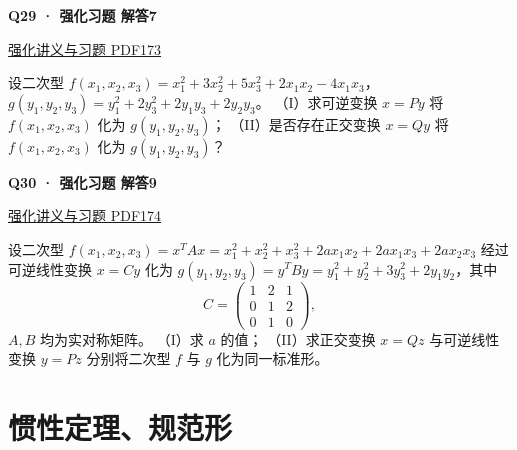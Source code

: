 \documentclass[UTF8,fontset=fandol,11pt,a4paper]{ctexart}
\newcommand{\source}[1]{{\footnotesize\color{Muted}#1\par}}
\newcommand{\qtitle}[2]{\par\needspace{5\baselineskip}\hypertarget{#1}{}\label{#1}\textbf{#2}\par}
\begin{document}
\begin{minipage}{\linewidth}
\qtitle{R-LONG-07}{Q29 · 强化习题 解答7}
\source{\href{file:///Users/skyintelligence/Desktop/\%E5\%BE\%97\%E8\%AF\%BB\%E4\%B8\%AA\%E7\%A0\%94-\%E5\%8C\%97\%E5\%A4\%A7\%E8\%BD\%AF\%E5\%BE\%AE/\%E6\%95\%B0\%E5\%AD\%A6\%20150/Kira\%C2\%B727\%E7\%BA\%BF\%E6\%80\%A7\%E4\%BB\%A3\%E6\%95\%B0\%E5\%BC\%BA\%E5\%8C\%96\%E8\%AE\%B2\%E4\%B9\%89\%2B\%E4\%B9\%A0\%E9\%A2\%98.pdf\#page=173}{强化讲义与习题 PDF173}}
设二次型 $f(x_1,x_2,x_3)=x_1^2+3x_2^2+5x_3^2+2x_1x_2-4x_1x_3$，
$g(y_1,y_2,y_3)=y_1^2+2y_3^2+2y_1y_3+2y_2y_3$。
（I）求可逆变换 $x=Py$ 将 $f(x_1,x_2,x_3)$ 化为 $g(y_1,y_2,y_3)$；
（II）是否存在正交变换 $x=Qy$ 将 $f(x_1,x_2,x_3)$ 化为 $g(y_1,y_2,y_3)$？
\end{minipage}\par\vspace{7mm}
\begin{minipage}{\linewidth}
\qtitle{R-LONG-09}{Q30 · 强化习题 解答9}
\source{\href{file:///Users/skyintelligence/Desktop/\%E5\%BE\%97\%E8\%AF\%BB\%E4\%B8\%AA\%E7\%A0\%94-\%E5\%8C\%97\%E5\%A4\%A7\%E8\%BD\%AF\%E5\%BE\%AE/\%E6\%95\%B0\%E5\%AD\%A6\%20150/Kira\%C2\%B727\%E7\%BA\%BF\%E6\%80\%A7\%E4\%BB\%A3\%E6\%95\%B0\%E5\%BC\%BA\%E5\%8C\%96\%E8\%AE\%B2\%E4\%B9\%89\%2B\%E4\%B9\%A0\%E9\%A2\%98.pdf\#page=174}{强化讲义与习题 PDF174}}
设二次型 $f(x_1,x_2,x_3)=x^TAx=x_1^2+x_2^2+x_3^2+2ax_1x_2+2ax_1x_3+2ax_2x_3$ 经过可逆线性变换 $x=Cy$ 化为 $g(y_1,y_2,y_3)=y^TBy=y_1^2+y_2^2+3y_3^2+2y_1y_2$，其中
\[C=\begin{pmatrix}1&2&1\\0&1&2\\0&1&0\end{pmatrix},\]
$A,B$ 均为实对称矩阵。
（I）求 $a$ 的值；
（II）求正交变换 $x=Qz$ 与可逆线性变换 $y=Pz$ 分别将二次型 $f$ 与 $g$ 化为同一标准形。
\end{minipage}\par\vspace{7mm}
\clearpage
\section*{惯性定理、规范形}
\end{document}
